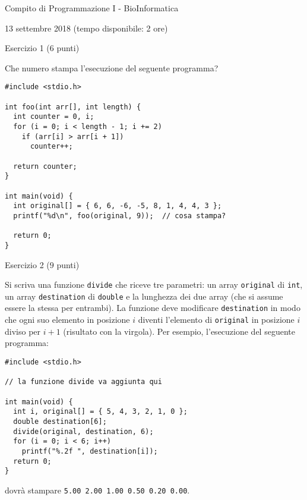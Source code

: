 \documentclass[12pt]{article}
\begin{document}
\begin{center}{\LARGE Compito di Programmazione I - BioInformatica}\\
\vspace*{-2ex}
\begin{center}
  \large 13 settembre 2018 (tempo disponibile: 2 ore)
\end{center}
\end{center}

\begin{center}{\Large Esercizio 1} ($6$ punti)
\end{center}
Che numero stampa l'esecuzione del seguente programma?
\begin{lstlisting}
#include <stdio.h>

int foo(int arr[], int length) {
  int counter = 0, i;
  for (i = 0; i < length - 1; i += 2)
    if (arr[i] > arr[i + 1])
      counter++;

  return counter;
}

int main(void) {
  int original[] = { 6, 6, -6, -5, 8, 1, 4, 4, 3 };
  printf("%d\n", foo(original, 9));  // cosa stampa?

  return 0;
}
\end{lstlisting}

\vspace*{1ex}
\begin{center}{\Large Esercizio 2} ($9$ punti)
\end{center}
Si scriva una funzione \texttt{divide} che riceve tre parametri: un array
\texttt{original} di \texttt{int}, un array \texttt{destination} di \texttt{double}
e la lunghezza dei due array (che si assume essere la stessa per entrambi).
La funzione deve modificare \texttt{destination} in modo che ogni suo elemento
in posizione $i$ diventi l'elemento di \texttt{original} in posizione $i$
diviso per $i + 1$ (risultato con la virgola). Per esempio, l'esecuzione
del seguente programma:

\begin{lstlisting}
#include <stdio.h>

// la funzione divide va aggiunta qui

int main(void) {
  int i, original[] = { 5, 4, 3, 2, 1, 0 };
  double destination[6];
  divide(original, destination, 6);
  for (i = 0; i < 6; i++)
    printf("%.2f ", destination[i]);
  return 0;
}
\end{lstlisting}
dovr\`a stampare \texttt{5.00 2.00 1.00 0.50 0.20 0.00}.
\newpage
\end{document}
